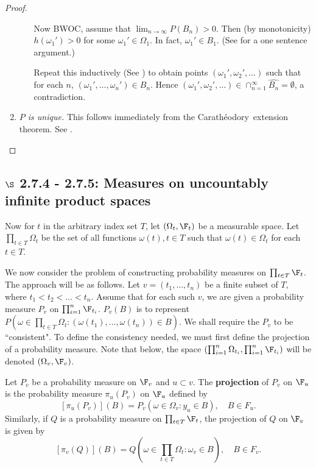 \documentclass{article} %
\newcommand{\Caratheodory}{Carath\'eodory}
\newcommand{\cylinder}[1]{\widehat{#1}}
\begin{document}
\begin{proof}
\begin{enumerate}
\begin{enumerate}
Now BWOC, assume that $\lim_{n \to \infty} P(B_n) > 0$.  Then (by monotonicity) $h(\omega_1')>0$ for some $\omega_1' \in \Omega_1$.  In fact, $\omega_1' \in B_1$.  (See \cite{ash2000probability} for a one sentence argument.)

Repeat this inductively (See \cite{ash2000probability}) to obtain points $(\omega_1', \omega_2', \hdots)$ such that for each $n$, $(\omega_1', \hdots, \omega_n') \in B_n$.  Hence $(\omega_1', \omega_2', \hdots) \in \cap_{n=1}^\infty \cylinder{B_n} = \emptyset$, a contradiction. 
\end{enumerate}
\item \textit{$P$ is unique.} This follows immediately from the \Caratheodory~extension theorem. See \cite{ash2000probability}.
\end{enumerate}

\end{proof}

\subsection{$\S$ 2.7.4 - 2.7.5: Measures on uncountably infinite product spaces}

Now for $t$ in the arbitrary index set $T$, let $(\Omega_t, \F_t)$ be a measurable space.  Let $\prod_{t \in T} \Omega_t$ be the set of all functions $\omega(t), t \in T$ such that $\omega(t) \in \Omega_t$ for each $t \in T$.  

We now consider the problem of constructing probability measures on $\prod_{t \in T} \F_t$.  The approach will be as follows.  Let $v=(t_1, \hdots, t_n)$ be a finite subset of $T$, where $t_1 < t_2 < \hdots < t_n$.  Assume that for each such $v$, we are given a probability measure $P_v$ on $\prod_{i=1}^n \F_{t_i}$.   $P_v(B)$ is to represent $P(\omega \in \prod_{t \in T} \Omega_t : (\omega(t_1), \hdots, \omega(t_n)) \in B)$.  We shall require the $P_v$ to be ``consistent".  To define the consistency needed, we must first define the projection of a probability measure.  Note that below,  the space $(\prod_{i=1}^n \Omega_{t_i}, \prod_{i=1}^n \F_{t_i})$ will be denoted $(\Omega_v, \F_v)$. 

\begin{definition}
Let $P_v$ be a probability measure on $\F_v$ and $u \subset v$. The \textbf{projection} of $P_v$ on $\F_u$ is the probability measure $\pi_u(P_v)$ on $\F_u$ defined by
\[ [\pi_u(P_v)](B) = P_v(\omega \in \Omega_v : y_u \in B), \quad B \in F_u. \]
Similarly, if $Q$ is a probability measure on $\prod_{t \in T} \F_t$, the projection of $Q$ on $\F_v$ is given by 
\[ [\pi_v(Q)](B) = Q(\omega \in \prod_{t \in T} \Omega_t : \omega_v \in B), \quad B \in F_v. \]
\label{def:projection_of_probability_measure}
\end{definition}
\end{document}

